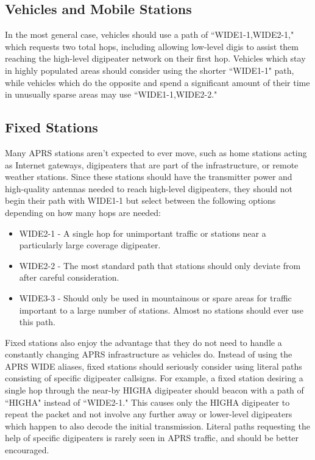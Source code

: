 \subsection{Vehicles and Mobile Stations}

In the most general case, vehicles should use a path of ``WIDE1-1,WIDE2-1,"
which requests two total hops, including allowing low-level digis to assist
them reaching the high-level digipeater network on their first hop.
Vehicles which stay in highly populated areas should consider using the
shorter ``WIDE1-1" path, while vehicles which do the opposite and spend
a significant amount
of their time in unusually sparse areas 
may use ``WIDE1-1,WIDE2-2." \cite{infoaprspath}

\subsection{Fixed Stations}

Many APRS stations aren't expected to ever move, such as home stations acting
as Internet gateways, digipeaters that are part of the infrastructure, or
remote weather stations.
Since these stations should have the transmitter power and high-quality antennas
needed to reach high-level digipeaters,
they should not begin their path with WIDE1-1 but select between the following
options depending on how many hops are needed:
\begin{itemize}
	\item WIDE2-1 - A single hop for unimportant traffic or stations near a
		particularly large coverage digipeater.
	\item WIDE2-2 - The most standard path that stations should only
		deviate from after careful consideration.
	\item WIDE3-3 - Should only be used in mountainous or spare areas for
		traffic important to a large number of stations. Almost no 
		stations should ever use this path.
\end{itemize}

Fixed stations also enjoy the advantage that they do not need to handle a
constantly changing APRS infrastructure as vehicles do.
Instead of using the APRS WIDE aliases, fixed stations should seriously
consider using literal paths consisting of specific digipeater callsigns.
For example, a fixed station desiring a single hop through the near-by
HIGHA digipeater should beacon with a path of ``HIGHA" instead of ``WIDE2-1."
This causes only the HIGHA digipeater to repeat the packet and not involve
any further away or lower-level digipeaters which happen to also decode the
initial transmission. 
Literal paths requesting the help of specific digipeaters is rarely
seen in APRS traffic, and should be better encouraged.

